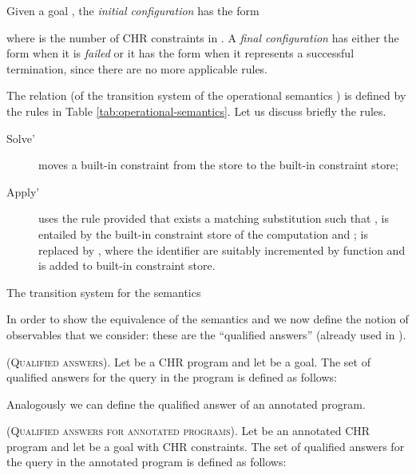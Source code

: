 \documentclass[final]{acmtrans2e}
\begin{document}
Given a goal , the  {\em initial configuration} has the form

where  is the number of CHR constraints in . A {\em final
configuration} has either the form  when it is {\em failed} or it has the form  when it represents a successful
termination, since there are no more applicable rules.

The relation  (of the transition system of
the operational semantics ) is defined  by the rules in
Table \ref{tab:operational-semantics}.  Let us discuss briefly
the rules.

\begin{description}
\item[Solve']{moves a built-in constraint from the store to the
built-in constraint store;}

\item[Apply']{uses the rule  provided that exists a matching
substitution  such that ,  is entailed by the built-in constraint
store of the computation and ;  is replaced by , where the identifier
are suitably incremented by  function and  is added to built-in constraint
store.}
\end{description}

\begin{table*}[t]
\caption{The transition system  for the  semantics}
\centering
\label{tab:operational-semantics}

\end{table*}






In order to show the equivalence of the semantics  and
 we now define the  notion of observables that we
consider: these are the ``qualified answers'' (already used in
\cite{Fru98}).



\begin{definition}\textsc{(Qualified answers)}. Let  be a CHR program and let
 be a goal. The set  of
qualified answers for the query  in the program  is defined
as follows:

\end{definition}

Analogously we can define the qualified answer of an annotated
program.

\begin{definition}\textsc{(Qualified answers for annotated programs)}.
Let  be an annotated CHR program and let  be a goal with 
CHR constraints. The set  of qualified answers
for the query  in the annotated program  is defined as follows:

\end{definition}
\end{document}
